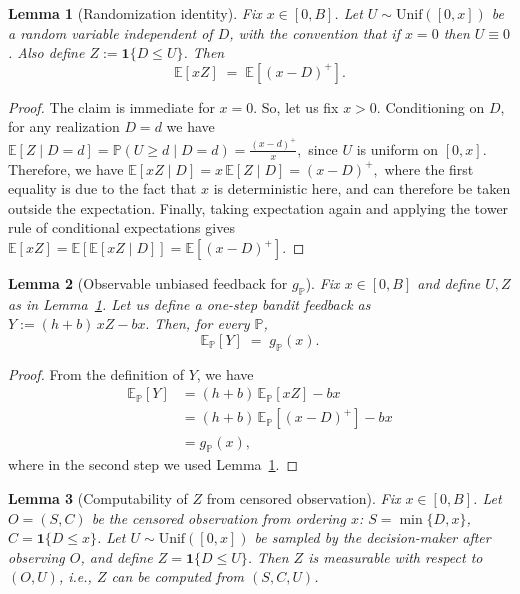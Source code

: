 \documentclass[11pt]{article}
\newtheorem{lemma}{Lemma}
\renewcommand{\P}{\mathbb{P}}
\begin{document}
\begin{lemma}[Randomization identity]\label{lem:randomization_identity}
Fix \(x\in[0,B]\). Let \(U \sim \mathrm{Unif}([0,x])\) be a random variable independent of \(D\), with the convention that if \(x=0\) then \(U\equiv 0\). Also define \(Z := \mathbf{1}\{D \le U\}\). Then
\[
\mathbb{E}[x Z] \;=\; \mathbb{E}[(x-D)^+].
\]
\end{lemma}

\begin{proof}
The claim is immediate for \(x=0\). So, let us fix \(x>0\). Conditioning on \(D\), for any realization \(D=d\) we have
\(
\mathbb{E}[Z\mid D=d] = \mathbb{P}(U\ge d\mid D=d)
= \frac{(x-d)^+}{x},
\)
since \(U\) is uniform on \([0,x]\).
Therefore, we have
\(\mathbb{E}[xZ\mid D] = x\,\mathbb{E}[Z\mid D] = (x-D)^+,\) where the first equality is due to the fact that $x$ is deterministic here, and can therefore be taken outside the expectation. Finally, taking expectation again and applying the tower rule of conditional expectations gives \(\mathbb{E}[xZ]= \mathbb{E}[\mathbb{E}[xZ\mid D]] = \mathbb{E}[(x-D)^+]\).
\end{proof}

\begin{lemma}[Observable unbiased feedback for \(g_\P\)]\label{lem:unbiased_feedback}
Fix \(x\in[0,B]\) and define \(U,Z\) as in Lemma~\ref{lem:randomization_identity}. Let us define a one-step bandit feedback as \(Y := (h+b)\,x Z - b x.\) Then, for every \(\P\),
\[
\mathbb{E}_\P[Y] \;=\; g_\P(x).
\]
\end{lemma}

\begin{proof}
From the definition of $Y$, we have
\begin{align*}
\mathbb{E}_\P[Y]
&= (h+b)\,\mathbb{E}_\P[xZ] - b x\\
&= (h+b)\,\mathbb{E}_\P[(x-D)^+] - b x\\
&= g_\P(x),
\end{align*}
where in the second step we used Lemma~\ref{lem:randomization_identity}.
\end{proof}

\begin{lemma}[Computability of \(Z\) from censored observation]\label{lem:Z_computable}
Fix \(x\in[0,B]\). Let \(O=(S,C)\) be the censored observation from ordering \(x\):
\(S=\min\{D,x\}\), \(C=\mathbf{1}\{D\le x\}\).
Let \(U\sim\mathrm{Unif}([0,x])\) be sampled by the decision-maker after observing \(O\),
and define \(Z=\mathbf{1}\{D\le U\}\).
Then \(Z\) is measurable with respect to \((O,U)\), i.e., \(Z\) can be computed from \((S,C,U)\).
\end{lemma}
\end{document}
